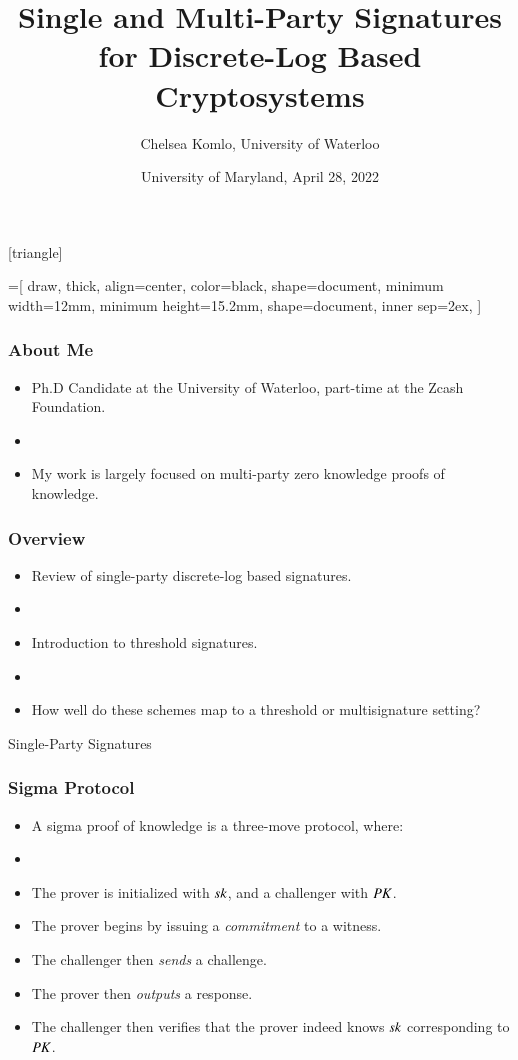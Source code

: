 \documentclass[hyperref={pdfpagelabels=true},table,dvipsnames,14pt,aspectratio=169]{beamer}
\title[Signatures for Discrete Logarithm Based Cryptosystems]{Single and Multi-Party Signatures for Discrete-Log Based Cryptosystems}
\author{Chelsea Komlo, University of Waterloo}
\date[April 2022]{ University of Maryland, April 28, 2022}
\begin{document}
[triangle]

=[%
draw,
thick,
align=center,
color=black,
shape=document,
minimum width=12mm,
minimum height=15.2mm,
shape=document,
inner sep=2ex,
]

\begin{frame}
        \thispagestyle{empty}
        \maketitle
\end{frame}

\begin{frame}
  \frametitle{About Me}

  \begin{itemize}
    \item<1-> Ph.D Candidate at the University of Waterloo, part-time at the Zcash Foundation. 
    \item[]
    \item<1-> My work is largely focused on multi-party zero knowledge proofs of knowledge. 
  \end{itemize}
\end{frame}

\begin{frame}
  \frametitle{Overview}

  \begin{itemize}
    \item<1-> Review of single-party discrete-log based signatures.
    \item[]
    \item<2-> Introduction to threshold signatures. 
    \item[]
    \item<3-> How well do these schemes map to a threshold or multisignature setting? 
  \end{itemize}
\end{frame}

\begin{frame}
  \huge 
  Single-Party Signatures 
\end{frame}

\begin{frame}
  \frametitle{Sigma Protocol}

  \begin{itemize}
    \item<1-> A sigma proof of knowledge is a three-move protocol, where:
    \item[]
    \item<2->[1.] The prover is initialized with $\mathit{sk}$, and a challenger with $\mathit{PK}$. 
    \item<3->[2.] The prover begins by issuing a \emph{commitment} to a witness.
    \item<4->[3.] The challenger then \emph{sends} a challenge. 
    \item<5->[4.] The prover then \emph{outputs} a response. 
    \item<6->[5.] The challenger then verifies that the prover indeed knows $\mathit{sk}$ corresponding to $\mathit{PK}$.
  \end{itemize}
\end{frame}
\end{document}
